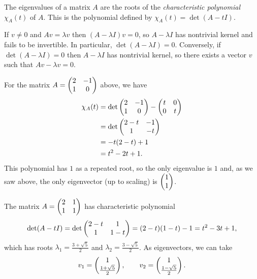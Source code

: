 \documentclass{article}
\begin{document}
\begin{Theorem}\label{thm:charpoly}
The eigenvalues of a matrix \(A\) are the roots of the {\em
characteristic polynomial} \(\chi_A(t)\) of \(A\). This is the
polynomial defined by \(\chi_A(t)=\det(A-tI)\).
\end{Theorem}
\begin{Proof}\label{prf:thm:charpoly}
If \(v\neq 0\) and \(Av=\lambda v\) then \((A-\lambda I)v=0\), so
\(A-\lambda I\) has nontrivial kernel and fails to be invertible. In
particular, \(\det(A-\lambda I)=0\). Conversely, if \(\det(A-\lambda
I)=0\) then \(A-\lambda I\) has nontrivial kernel, so there exists a
vector \(v\) such that \(Av-\lambda v=0\). \qedhere


\end{Proof}
\begin{Example}
For the matrix \(A=\begin{pmatrix} 2 & -1 \\ 1 & 0 \end{pmatrix}\) above, we have
\begin{align*}
\chi_A(t)&=\det\begin{pmatrix} 2 & -1 \\ 1 & 0 \end{pmatrix}-\begin{pmatrix} t & 0 \\ 0 & t\end{pmatrix}\\
&=\det\begin{pmatrix} 2-t & -1 \\ 1 & -t\end{pmatrix}\\
&=-t(2-t)+1\\
&=t^2-2t+1.
\end{align*}
This polynomial has \(1\) as a repeated root, so the only eigenvalue
is \(1\) and, as we saw above, the only eigenvector (up to scaling)
is \(\begin{pmatrix} 1 \\ 1\end{pmatrix}\).


\end{Example}
\begin{Example}\label{exm:cat}
The matrix \(A=\begin{pmatrix} 2 & 1 \\ 1 & 1 \end{pmatrix}\) has characteristic
polynomial \[\det(A-tI)=\det\begin{pmatrix} 2-t & 1 \\ 1 &
1-t\end{pmatrix}=(2-t)(1-t)-1=t^2-3t+1,\] which has roots
\(\lambda_1=\frac{3+\sqrt{5}}{2}\) and
\(\lambda_2=\frac{3-\sqrt{5}}{2}\). As eigenvectors, we can take
\[v_1=\begin{pmatrix} 1\\ \frac{1+\sqrt{5}}{2}\end{pmatrix},\qquad v_2=\begin{pmatrix} 1
\\ \frac{1-\sqrt{5}}{2}\end{pmatrix}.\]


\end{Example}
\end{document}
